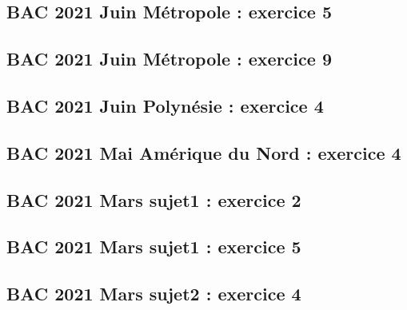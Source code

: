 \documentclass[lang=fr,edition=teacher,layout=sheet]{mxbook}
\begin{document}
\begingroup\endgroup
\par\bigskip
{}\subsection*{BAC 2021 Juin Métropole : exercice 5}
\begingroup\endgroup
\par\bigskip
{}\subsection*{BAC 2021 Juin Métropole : exercice 9}
\begingroup\endgroup
\par\bigskip
{}\subsection*{BAC 2021 Juin Polynésie : exercice 4}
\begingroup\endgroup
\par\bigskip
{}\subsection*{BAC 2021 Mai Amérique du Nord : exercice 4}
\begingroup\endgroup
\par\bigskip
{}\subsection*{BAC 2021 Mars sujet1 : exercice 2}
\begingroup\endgroup
\par\bigskip
{}\subsection*{BAC 2021 Mars sujet1 : exercice 5}
\begingroup\endgroup
\par\bigskip
{}\subsection*{BAC 2021 Mars sujet2 : exercice 4}
\end{document}
